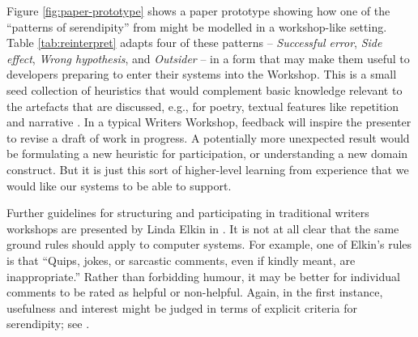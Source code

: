 Figure \ref{fig:paper-prototype} shows a paper prototype showing how
one of the ``patterns of serendipity'' from  might be
modelled in a workshop-like setting.  Table \ref{tab:reinterpret}
adapts four of these patterns -- \emph{Successful error}, \emph{Side
  effect}, \emph{Wrong hypothesis}, and \emph{Outsider} -- in a form
that may make them useful to developers preparing to enter their
systems into the Workshop.  This is a small seed collection of
heuristics that would complement basic knowledge relevant to the
artefacts that are discussed, e.g., for poetry, textual features like
repetition and narrative \cite{corneli15iccc}.  In a typical Writers
Workshop, feedback will inspire the presenter to revise a draft of
work in progress.  A potentially more unexpected result would be
formulating a new heuristic for participation, or understanding a new
domain construct.  But it is just this sort of higher-level learning
from experience that we would like our systems to be able to support.


Further guidelines for structuring and participating in traditional
writers workshops are presented by Linda Elkin in
\cite[pp. 201--203]{gabriel2002writer}.  It is not at all clear that
the same ground rules should apply to computer systems.  For example,
one of Elkin's rules is that ``Quips, jokes, or sarcastic comments,
even if kindly meant, are inappropriate.''  Rather than forbidding
humour, it may be better for individual comments to be rated as
helpful or non-helpful.  Again, in the first instance, usefulness
and interest might be judged in terms of explicit criteria for serendipity;
see \cite{corneli15cc,pease2013discussion}.

